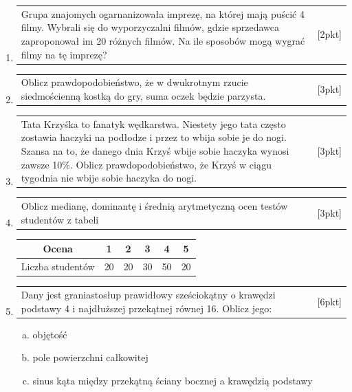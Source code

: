 \documentclass[12pt,a4paper]{article}
\begin{document}
\begin{enumerate}[1.]
		\item  \begin{tabular}{p{13cm} r}
			Grupa znajomych ogarnanizowała imprezę, na której mają puścić 4 filmy. Wybrali się do wyporzyczalni filmów, gdzie sprzedawca zaproponował im 20 różnych filmów. Na ile sposobów mogą wygrać filmy na tę imprezę?&[2pkt]\\ 
		\end{tabular}
		
		\item  \begin{tabular}{p{13cm} r}
			Oblicz prawdopodobieństwo, że w dwukrotnym rzucie siedmościenną kostką do gry, suma oczek będzie parzysta.&[3pkt]\\ 
		\end{tabular}
		
		\item  \begin{tabular}{p{13cm} r}
			Tata Krzyśka to fanatyk wędkarstwa. Niestety jego tata często zostawia haczyki na podłodze i przez to wbija sobie je do nogi. Szansa na to, że danego dnia Krzyś wbije sobie haczyka wynosi zawsze 10\%. Oblicz prawdopodobieństwo, że Krzyś w ciągu tygodnia nie wbije sobie haczyka do nogi. &[3pkt]\\ 
		\end{tabular}
		
		\item  \begin{tabular}{p{13cm} r}
			Oblicz medianę, dominantę i średnią arytmetyczną ocen testów studentów z tabeli &[3pkt]\\ 
		\end{tabular}
		
		\begin{tabular}{|c|c|c|c|c|c|}
			\hline
			Ocena&1&2&3&4&5\\
			\hline
			Liczba studentów&20&20&30&50&20\\
			\hline
		\end{tabular}
		\newpage
		\item  \begin{tabular}{p{13cm} r}
			Dany jest graniastosłup prawidłowy sześciokątny o krawędzi podstawy 4 i najdłuższej przekątnej równej 16. Oblicz jego:&[6pkt]\\ 
		\end{tabular}
		\begin{enumerate}[a)]
			\item objętość
			\item pole powierzchni całkowitej
			\item sinus kąta między przekątną ściany bocznej a krawędzią podstawy
		\end{enumerate}
		

\end{enumerate}
\end{document}

